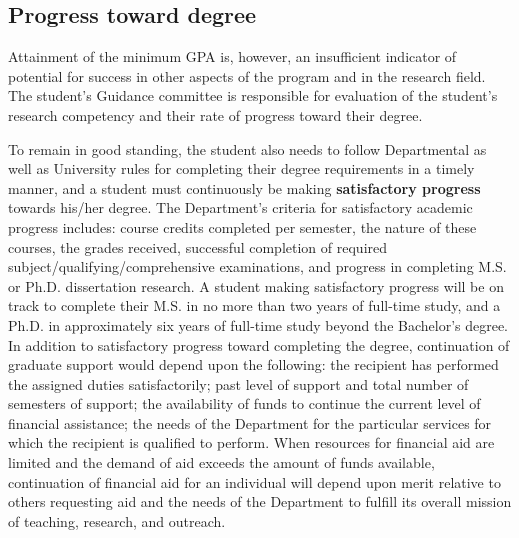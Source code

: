 
\subsection{Progress toward degree}

Attainment of the minimum GPA is, however, an insufficient
indicator of potential for success in other aspects of the program and
in the research field. The student's Guidance committee is responsible
for evaluation of the student's research competency and their rate of
progress toward their degree. 

To remain in good standing, the student also needs to follow
Departmental as well as University rules for completing their degree
requirements in a timely manner, and a student must continuously be
making \textbf{satisfactory progress} towards his/her degree.  The
Department's criteria for satisfactory academic progress includes:
course credits completed per semester, the nature of these courses,
the grades received, successful completion of required
subject/qualifying/comprehensive examinations, and progress in
completing M.S. or Ph.D. dissertation research.  A student making
satisfactory progress will be on track to complete their M.S. in no more than two years of full-time study,
and a Ph.D. in approximately six years of full-time study beyond the
Bachelor's degree.  In addition to
satisfactory progress toward completing the degree, continuation of
graduate support would depend upon the following: the recipient has
performed the assigned duties satisfactorily; past level of support
and total number of semesters of support; the availability of funds to
continue the current level of financial assistance; the needs of the
Department for the particular services for which the recipient is
qualified to perform.  When resources for financial aid are limited
and the demand of aid exceeds the amount of funds available,
continuation of financial aid for an individual will depend upon merit
relative to others requesting aid and the needs of the Department to
fulfill its overall mission of teaching, research, and outreach.  
 
